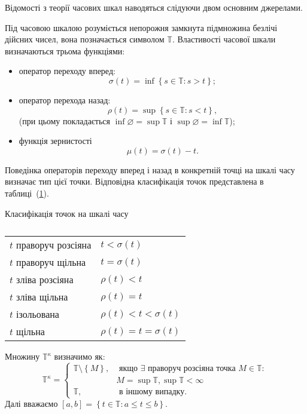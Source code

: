 Відомості з теорії часових шкал наводяться слідуючи двом основним
джерелами\cite{Bohner,BohnerAdv}.

\begin{definition}
Під часовою шкалою розуміється непорожня замкнута підмножина безлічі
дійсних чисел, вона позначається символом $\mathbb{T}$.
Властивості часової шкали визначаються трьома функціями:	
\begin{itemize}
		\item[1)] оператор переходу вперед:
		\[
		\sigma(t) = \inf\left\{s \in \mathbb{T}: s > t\right\};
		\]
		\item[2)] оператор перехода назад:
		\[
		\rho(t) = \sup\left\{s \in \mathbb{T}: s < t\right\},
		\]
		(при цьому покладається  $\inf\varnothing = \sup{\mathbb{T}}$ і $\sup\varnothing = \inf{\mathbb{T}}$);
		\item[3)]функція зернистості
		$$\mu(t) = \sigma(t) - t.$$
	\end{itemize}
\end{definition}
Поведінка операторів переходу вперед і назад в конкретній точці на шкалі часу
визначає тип цієї точки. Відповідна класифікація точок представлена в
таблиці~(\ref{tab:pointclass}).
\begin{table}[h]

	\centering		
		\caption{}	Класифікація точок на шкалі часу\\
		\begin{tabular}{|l|l|}
			\hline
			$t$ праворуч розсіяна & $t < \sigma(t)$ \\
			$t$ праворуч щільна    & $t = \sigma(t)$ \\
			$t$ зліва розсіяна  & $ \rho(t) < t $ \\
			$t$ зліва щільна     & $ \rho(t) = t $ \\
			$t$ ізольована      & $\rho(t) < t < \sigma(t)$ \\
			$t$ щільна          & $\rho(t) = t = \sigma(t)$ \\
			\hline
		\end{tabular}
	
	\label{tab:pointclass}
\end{table}

\begin{definition}
	 Множину $\mathbb{T}^\kappa$ визначимо як:
	 \[
	 \mathbb{T}^\kappa =
	 \begin{cases}
	 \mathbb{T}\setminus \left\{M\right\}, & \text{ якщо }
	 \exists \text{ праворуч розсіяна точка } M \in \mathbb{T}:\\
	 & M = \sup\mathbb{T}, \sup\mathbb{T}<\infty  \\
	 \mathbb{T} , & \text{ в іншому випадку}.
	 \end{cases}
	 \]
	 Далі вважаємо $\left[a, b\right] =
	 \left\{t \in \mathbb{T} : a \leqslant t \leqslant b\right\}$.
\end{definition}

